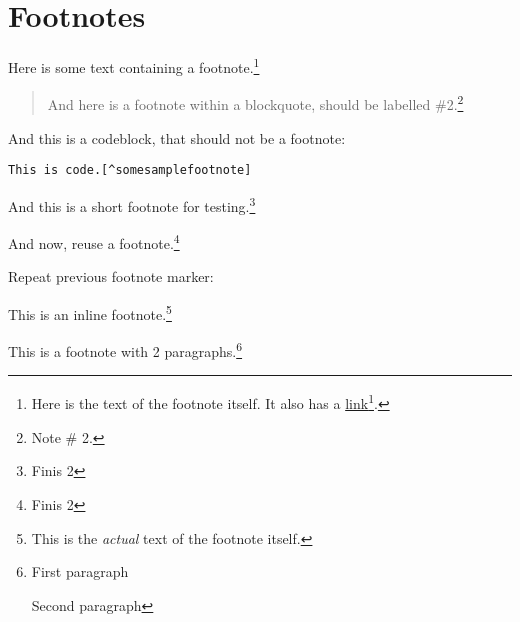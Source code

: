 
\def\mytitle{MultiMarkdown Footer Test}


\part{Footnotes}
\label{footnotes}

Here is some text containing a footnote.\footnote{Here is the text of the footnote itself. It also has a \href{http://somelink.com}{link}\footnote{\href{http://somelink.com}{http:/\slash somelink.com}}.}

\begin{quote}

And here is a footnote within a blockquote, should be labelled \#2.\footnote{Note \# 2.}
\end{quote}

And this is a codeblock, that should not be a footnote:

\begin{verbatim}
This is code.[^somesamplefootnote]
\end{verbatim}

And this is a short footnote for testing.\footnote{Finis 2}

And now, reuse a footnote.\footnote{Finis 2}

Repeat previous footnote marker:

This is an inline footnote.\footnote{This is the \emph{actual} text of the footnote itself.}

This is a footnote with 2 paragraphs.\footnote{First paragraph

Second paragraph}




